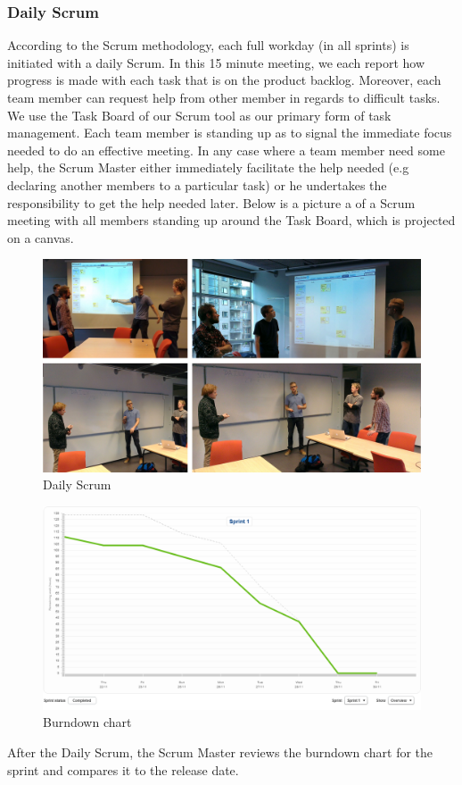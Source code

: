 \subsubsection{Daily Scrum}
According to the Scrum methodology, each full workday (in all sprints) is initiated with a daily Scrum. In this 15 minute meeting, we each report how progress is made with each task that is on the product backlog. Moreover, each team member can request help from other member in regards to difficult tasks. We use the Task Board of our Scrum tool as our primary form of task management. Each team member is standing up as to signal the immediate focus needed to do an effective meeting. In any case where a team member need some help, the Scrum Master either immediately facilitate the help needed (e.g declaring another members to a particular task) or he undertakes the responsibility to get the help needed later. Below is a picture a of a Scrum meeting with all members standing up around the Task Board, which is projected on a canvas.
\begin{figure}[H]
  \includegraphics[width=\textwidth]{illustrations/DailyScrumCombined.jpg}
  \caption{Daily Scrum}
  \label{dailyscrum}
\end{figure}
\begin{figure}[H]
  \includegraphics[width=\textwidth]{illustrations/burndown.png}
  \caption{Burndown chart}
  \label{burndown}
\end{figure}
After the Daily Scrum, the Scrum Master reviews the burndown chart for the sprint and compares it to the release date. 
